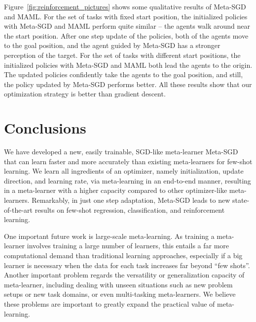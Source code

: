\documentclass{article}
\begin{document}
Figure~\ref{fig:reinforcement_pictures} shows some qualitative results of Meta-SGD and MAML. For the set of tasks with fixed start position, the initialized policies with Meta-SGD and MAML perform quite similar -- the agents walk around near the start position. After one step update of the policies, both of the agents move to the goal position, and the agent guided by Meta-SGD has a stronger perception of the target. For the set of tasks with different start positions, the initialized policies with Meta-SGD and MAML both lead the agents to the origin. The updated policies confidently take the agents to the goal position, and still, the policy updated by Meta-SGD performs better. All these results show that our optimization strategy is better than gradient descent.














 






 \section{Conclusions}



We have developed a new, easily trainable, SGD-like meta-learner Meta-SGD that can learn faster and more accurately than existing meta-learners for few-shot learning. We learn all ingredients of an optimizer, namely initialization, update direction, and learning rate, via meta-learning in an end-to-end manner, resulting in a meta-learner with a higher capacity compared to other optimizer-like meta-learners. Remarkably, in just one step adaptation, Meta-SGD leads to new state-of-the-art results on few-shot regression, classification, and reinforcement learning.  

One important future work is large-scale meta-learning. As training a meta-learner involves training a large number of learners, this entails a far more  computational demand than traditional learning approaches, especially if a big learner is necessary when the data for each task increases far beyond ``few shots''. Another important problem regards the versatility or generalization capacity of meta-learner, including dealing with unseen situations such as new problem setups or new task domains, or even multi-tasking meta-learners. We believe these problems are important to greatly expand the practical value of meta-learning.

 {\small
\setlength{\bibsep}{5pt}


}
\end{document}
